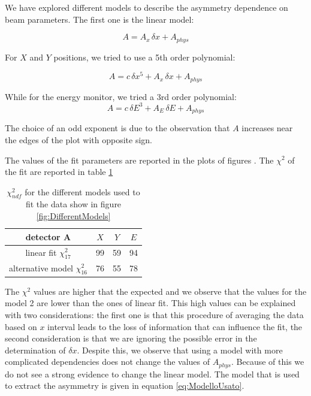 We have explored different models to describe the asymmetry dependence on beam parameters. The first one is the linear model: 

\begin{equation}
A = A_{x} \, \delta x + A_{phys}
\end{equation}

For $X$ and $Y$ positions, we tried to use a 5th order polynomial:

\begin{equation}
A = c \, \delta x^{5} + A_{x} \, \delta x + A_{phys}
\end{equation}

While for the energy monitor, we tried a 3rd order polynomial:
\begin{equation}
A = c \, \delta E^{3} + A_{E} \, \delta E + A_{phys}
\end{equation}

The choice of an odd exponent is due to the observation that $A$ increases near the edges of the plot with opposite sign.

The values of the fit parameters are reported in the plots of figures . The $\chi^{2}$ of the fit are reported in table \ref{tab:ChisqDiffModel}

\begin{table}[ht]
\begin{tabular}{c|c|c|c}
\hline 
detector A & $X$ & $Y$ & $E$ \\
\hline 
linear fit $\chi^{2}_{17}$ & 99 & 59 & 94 \\ 
alternative model $\chi^{2}_{16}$ & 76 & 55 & 78 \\ 
\end{tabular}
\caption{$\chi^{2} _{ndf}$ for the different models used to fit the data show in figure \ref{fig:DifferentModels}}
\label{tab:ChisqDiffModel}
\end{table}

The $\chi^{2}$ values are higher that the expected and we observe that the values for the model 2 are lower than the ones of linear fit.
This high values can be explained with two considerations: the first one is that this procedure of averaging the data based on $x$ interval leads to the loss of information that can influence the fit, the second consideration is that we are ignoring the possible error in the determination of $\delta x$.
Despite this, we observe that using a model with more complicated dependencies does not change  the values of $A_{phys}$. Because of this we do not see a strong evidence to change the linear model. The model that is used to extract the asymmetry is given in equation \ref{eq:ModelloUsato}. 

